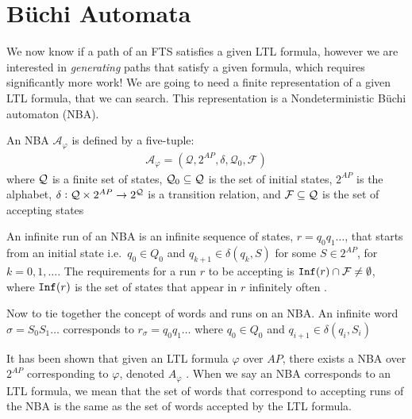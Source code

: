 \section{B\"{u}chi Automata}
We now know if a path of an FTS satisfies a given LTL formula, however we are interested in \textit{generating} paths that satisfy a given formula, which requires significantly more work! We are going to need a finite representation of a given LTL formula, that we can search. This representation is a Nondeterministic B\"{u}chi automaton (NBA). 
\begin{definition}
\label{defNBA}
An NBA $\mathcal{A}_\varphi$ is defined by a five-tuple:
\begin{align*}
\mathcal{A}_\varphi = (\mathcal{Q},2^{AP},\delta,\mathcal{Q}_0,\mathcal{F})
\end{align*}
where $\mathcal{Q}$ is a finite set of states, $\mathcal{Q}_0 \subseteq \mathcal{Q}$ is the set of initial states, $2^{AP}$ is the alphabet, $\delta: \mathcal{Q} \times 2^{AP} \rightarrow 2^{\mathcal{Q}}$ is a transition relation, and $\mathcal{F} \subseteq \mathcal{Q}$ is the set of accepting states
\end{definition} 
An infinite run of an NBA is an infinite sequence of states, $r=q_0 q_1 \dots$, that starts from an initial state i.e.\ $q_0 \in Q_0$ and $q_{k+1} \in \delta(q_k, S)$ for some $S \in 2^{AP}$, for $k = 0,1,\dots$. The requirements for a run $r$ to be accepting is $\texttt{Inf}(r) \cap \mathcal{F} \neq \emptyset$, where $\texttt{Inf}(r)$ is the set of states that appear in $r$ infinitely often \cite{guo15}. 

Now to tie together the concept of words and runs on an NBA. An infinite word $\sigma = S_0 S_1 \dots$ corresponds to $r_\sigma = q_0 q_1 \dots$ where $q_0 \in Q_0$ and $q_{i+1} \in \delta(q_i,S_i)$

It has been shown that given an LTL formula $\varphi$ over $AP$, there exists a NBA over $2^{AP}$ corresponding to $\varphi$, denoted $A_\varphi$ \cite{baier08}. When we say an NBA corresponds to an LTL formula, we mean that the set of words that correspond to accepting runs of the NBA is the same as the set of words accepted by the LTL formula.  

